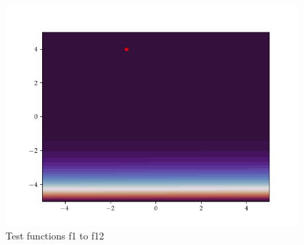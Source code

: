 \begin{figure}[h]
\begin{minipage}[b]{0.32\textwidth}
      \includegraphics[trim=2.5cm 1.3cm 2.5cm 1.3cm,clip,width=\textwidth]{Figures/coco/f12.png}
    \end{minipage}
    \caption{Test functions f1 to f12}
    \label{2DBlockcyclic}
  \end{figure}
  
